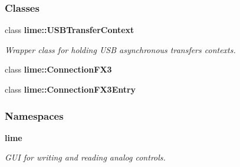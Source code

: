 \subsubsection*{Classes}
\begin{DoxyCompactItemize}
\item 
class {\bf lime\+::\+U\+S\+B\+Transfer\+Context}
\begin{DoxyCompactList}\small\item\em Wrapper class for holding U\+SB asynchronous transfers contexts. \end{DoxyCompactList}\item 
class {\bf lime\+::\+Connection\+F\+X3}
\item 
class {\bf lime\+::\+Connection\+F\+X3\+Entry}
\end{DoxyCompactItemize}
\subsubsection*{Namespaces}
\begin{DoxyCompactItemize}
\item 
 {\bf lime}
\begin{DoxyCompactList}\small\item\em G\+UI for writing and reading analog controls. \end{DoxyCompactList}\end{DoxyCompactItemize}
